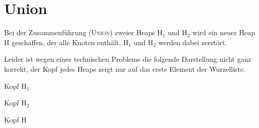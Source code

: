 \documentclass[ngerman,draft,parskip=half*,twoside]{scrreprt}
\theoremstyle{break}
\begin{document}
\section{Union}
Bei der Zusammenführung (\textsc{Union}) zweier Heaps H$_1$ und H$_2$ wird ein neuer Heap H geschaffen, der alle Knoten
enthält, H$_1$ und H$_2$ werden dabei zerstört.

%   
%  

Leider ist wegen eines technischen Problems die folgende Darstellung nicht ganz korrekt, der Kopf jedes Heaps zeigt nur
auf das erste Element der Wurzelliste.

\begin{bundle}{Kopf H$_1$}
  
\end{bundle} \hspace{15mm}
\begin{bundle}{Kopf H$_2$}
  
\end{bundle}\hspace{15mm}
\begin{bundle}{Kopf H}
\end{bundle}
\end{document}
